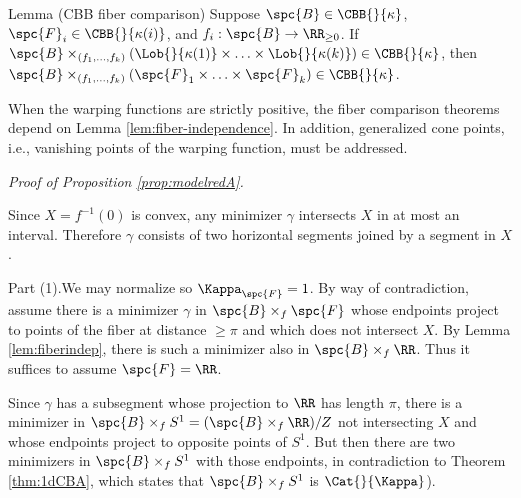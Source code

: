 \begin{thm}{Lemma (CBB fiber comparison)}
\label{thm:cbb-fiber-comparison}
Suppose $\spc{B}\in \CBB{}{\kappa}$,
$\spc{F}_i\in \CBB{}{\kappa(i)}$, and  $f_i:\spc{B}\to\RR_{\ge 0}$.   If $\spc{B}\times_{(f_1,\ldots,f_k)}(\Lob{}{\kappa(1)}\times\ldots\times \Lob{}{\kappa(k)})\in \CBB{}{\kappa}$, then
$\spc{B}\times_{(f_1,\ldots,f_k)}(\spc{F}_1\times\ldots\times \spc{F}_k)\in \CBB{}{\kappa}$.
 \end{thm}




When the warping functions are strictly positive, the fiber comparison theorems depend on Lemma \ref{lem:fiber-independence}.  In addition, generalized cone points, i.e., vanishing points of the warping function, must be addressed.  

\noindent\emph{Proof of Proposition  \ref{prop:modelredA}.}

Since $X=f^{-1}(0)$ is convex, any minimizer
$\gamma$ intersects $X$ in at most an interval.  Therefore $\gamma$
consists of two
horizontal segments joined by a segment in $X$.

Part (1).We  may normalize so $\Kappa_\spc{F}=1$.  By way of
contradiction, assume there
is a minimizer $\gamma$  in $\spc{B}\times_f\spc{F}$ whose
endpoints project to points of the fiber at distance $\ge\pi$ and
which does not intersect $X$.  By Lemma \ref{lem:fiberindep}, there
is such a minimizer also in $\spc{B}\times_f\RR$. Thus it suffices to assume
$\spc{F}=\RR$.

Since $\gamma$ has a subsegment whose  projection to
$\RR$ has length $\pi$, there is a minimizer in
$\spc{B}\times_fS^1=(\spc{B}\times_f\RR)/Z$ not intersecting $X$ and whose
endpoints project to opposite points of $S^1$.  But then there are
two minimizers in $\spc{B}\times_fS^1$  with those endpoints, in
contradiction to Theorem \ref{thm:1dCBA}, which states that
$\spc{B}\times_fS^1$ is $\Cat{}{\Kappa}$).
\qeds

